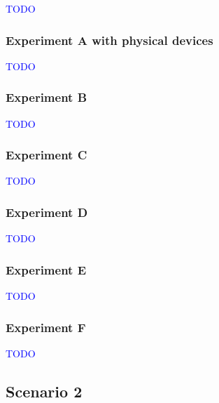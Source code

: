 \textcolor{blue}{TODO}


\subsubsection{Experiment A with physical devices}

\textcolor{blue}{TODO}


\subsubsection{Experiment B}

\textcolor{blue}{TODO}


\subsubsection{Experiment C}

\textcolor{blue}{TODO}


\subsubsection{Experiment D}

\textcolor{blue}{TODO}


\subsubsection{Experiment E}

\textcolor{blue}{TODO}


\subsubsection{Experiment F}

\textcolor{blue}{TODO}


\subsection{Scenario 2}\label{sec:discussion_scenario2}

